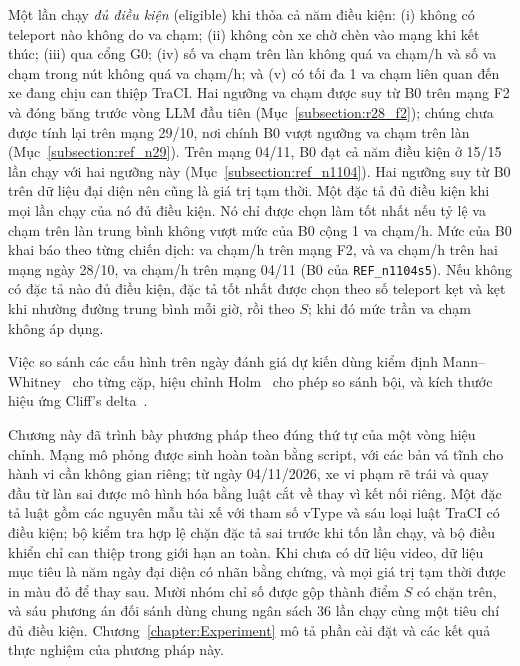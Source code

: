 \documentclass[../main.tex]{subfiles}
\begin{document}
Một lần chạy \emph{đủ điều kiện} (eligible) khi thỏa cả năm điều kiện: (i) không có teleport nào không do va chạm; (ii) không còn xe chờ chèn vào mạng khi kết thúc; (iii) qua cổng G0; (iv) số va chạm trên làn không quá  va chạm/h và số va chạm trong nút không quá  va chạm/h; và (v) có tối đa 1 va chạm liên quan đến xe đang chịu can thiệp TraCI. Hai ngưỡng va chạm được suy từ B0 trên mạng F2 và đóng băng trước vòng LLM đầu tiên (Mục~\ref{subsection:r28_f2}); chúng chưa được tính lại trên mạng 29/10, nơi chính B0 vượt ngưỡng va chạm trên làn (Mục~\ref{subsection:ref_n29}). Trên mạng 04/11, B0 đạt cả năm điều kiện ở 15/15 lần chạy với hai ngưỡng này (Mục~\ref{subsection:ref_n1104}). Hai ngưỡng suy từ B0 trên dữ liệu đại diện nên cũng là giá trị tạm thời. Một đặc tả đủ điều kiện khi mọi lần chạy của nó đủ điều kiện. Nó chỉ được chọn làm tốt nhất nếu tỷ lệ va chạm trên làn trung bình không vượt mức của B0 cộng 1 va chạm/h. Mức của B0 khai báo theo từng chiến dịch:  va chạm/h trên mạng F2,  và  va chạm/h trên hai mạng ngày 28/10,  va chạm/h trên mạng 04/11 (B0 của \texttt{REF\_n1104s5}). Nếu không có đặc tả nào đủ điều kiện, đặc tả tốt nhất được chọn theo số teleport kẹt và kẹt khi nhường đường trung bình mỗi giờ, rồi theo $S$; khi đó mức trần va chạm không áp dụng.

Việc so sánh các cấu hình trên ngày đánh giá dự kiến dùng kiểm định Mann--Whitney~\cite{mann1947test} cho từng cặp, hiệu chỉnh Holm~\cite{holm1979simple} cho phép so sánh bội, và kích thước hiệu ứng Cliff's delta~\cite{cliff1993dominance}.

Chương này đã trình bày phương pháp theo đúng thứ tự của một vòng hiệu chỉnh. Mạng mô phỏng được sinh hoàn toàn bằng script, với các bản vá tĩnh cho hành vi cần không gian riêng; từ ngày 04/11/2026, xe vi phạm rẽ trái và quay đầu từ làn sai được mô hình hóa bằng luật cắt về thay vì kết nối riêng. Một đặc tả luật gồm các nguyên mẫu tài xế với tham số vType và sáu loại luật TraCI có điều kiện; bộ kiểm tra hợp lệ chặn đặc tả sai trước khi tốn lần chạy, và bộ điều khiển chỉ can thiệp trong giới hạn an toàn. Khi chưa có dữ liệu video, dữ liệu mục tiêu là năm ngày đại diện có nhãn bằng chứng, và mọi giá trị tạm thời được in màu đỏ để thay sau. Mười nhóm chỉ số được gộp thành điểm $S$ có chặn trên, và sáu phương án đối sánh dùng chung ngân sách 36 lần chạy cùng một tiêu chí đủ điều kiện. Chương~\ref{chapter:Experiment} mô tả phần cài đặt và các kết quả thực nghiệm của phương pháp này.
\end{document}
